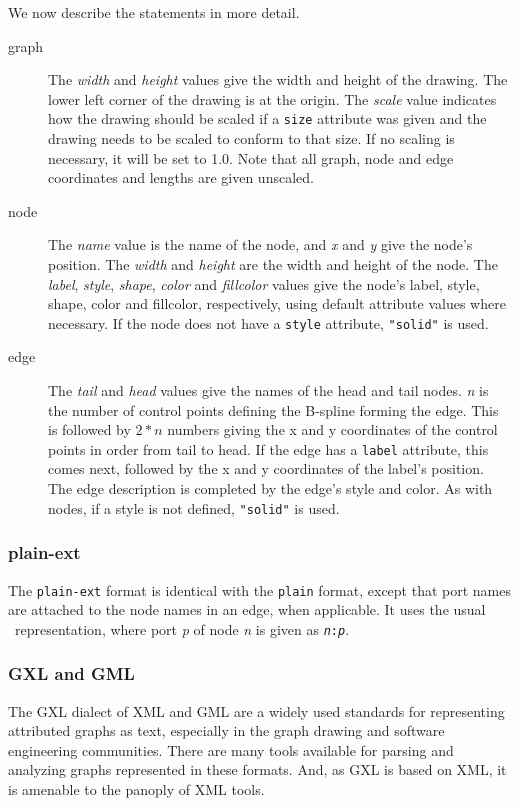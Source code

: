 We now describe the statements in more detail.
\begin{description}
\item[graph] 
The {\em width} and {\em height} values give the 
width and height of the drawing. The 
lower left corner of the drawing is at the origin. 
The {\em scale} value indicates 
how the drawing should be scaled if a {\tt size} attribute was given and the 
drawing needs to be scaled to conform to that size. If no scaling is 
necessary, it will be set to 1.0. Note that all graph, node and edge 
coordinates and lengths are given unscaled. 
\item[node] 
The {\em name} value is the name of the node, and 
{\em x} and {\em y} give the node's position. 
The {\em width} and {\em height} are the width and height of the node. 
The {\em label}, {\em style},
{\em shape}, {\em color} and {\em fillcolor} values 
give the node's label, style, shape, color and 
fillcolor, respectively, using default attribute values where necessary. 
If the node does not have a {\tt style} attribute, {\tt "solid"} is used. 
\item[edge] 
The {\em tail} and {\em head} values give the names of the head and tail nodes. 
{\em n} is the number of control points defining the B-spline forming the edge.
This is followed by $2*n$ numbers giving the x and y coordinates of the 
control points in order from tail to head. If the edge has a {\tt label}
attribute, 
this comes next, followed by the x and y coordinates of the label's position. 
The edge description is completed by the edge's style and color. As with 
nodes, if a style is not defined, {\tt "solid"} is used. 
\end{description}

\subsubsection{plain-ext}
The {\tt plain-ext} format is identical with the {\tt plain} format,
except that port names are attached to the node names in an edge,
when applicable. It uses the usual \DOT\ representation, where port
{\em p} of node {\em n} is given as {\tt {\em n}:{\em p}}.

\subsubsection{GXL and GML}
The GXL \cite{gxl} dialect of XML and GML \cite{gml} are a widely used standards for
representing attributed graphs as text, especially in the graph
drawing and software engineering communities. There
are many tools available for parsing and analyzing graphs represented
in these formats. And, as GXL is based on XML, it is amenable to the panoply of
XML tools.

